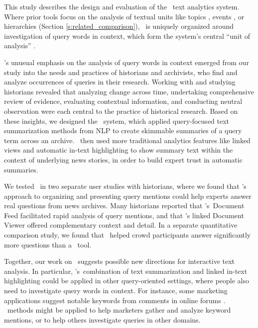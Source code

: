 
This study describes the design and evaluation of the \ours~text analytics system. 
Where prior tools focus on the analysis of textual units like topics \cite{tiara}, events \cite{eventriver}, or hierarchies \cite{overview} (Section \ref{s:related_comparison}), \ours~is uniquely organized around investigation of query words in context, which form the system's central ``unit of analysis'' \cite{chuangheer}.

\ours's unusual emphasis on the analysis of query words in context emerged from our study into the needs and practices of historians and archivists, who find and analyze occurrences of queries in their research.
Working with and studying historians revealed that analyzing change across time, undertaking comprehensive review of evidence, evaluating contextual information, and conducting neutral observation were each central to the practice of historical research.
Based on these insights, we designed the \ours~system, which applied query-focused text summarization methods from NLP to create skimmable summaries of a query term across an archive.
\ours~then used more traditional analytics features like linked views and automatic in-text highlighting to show summary text within the context of underlying news stories, in order to build expert trust in automatic summaries.

We tested \ours~in two separate user studies with historians, where we found that \ours's approach to organizing and presenting query mentions could help experts answer real questions from news archives.
Many historians reported that \ours's~Document Feed facilitated rapid analysis of query mentions, and that \ours's linked Document Viewer offered complementary context and detail.
In a separate quantitative comparison study, we found that \ours~helped crowd participants answer significantly more questions than a \Baselongname~tool.

Together, our work on \ours~suggests possible new directions for interactive text analysis.
In particular, \ours's~combination of text summarization and linked in-text highlighting could be applied in other query-oriented settings, where people also need to investigate query words in context.
For instance, some marketing applications suggest notable keywords from comments in online forums \cite[Section 4.1]{marketingkdd}.
\ours~methods might be applied to help marketers gather and analyze keyword mentions, or to help others investigate queries in other domains.
